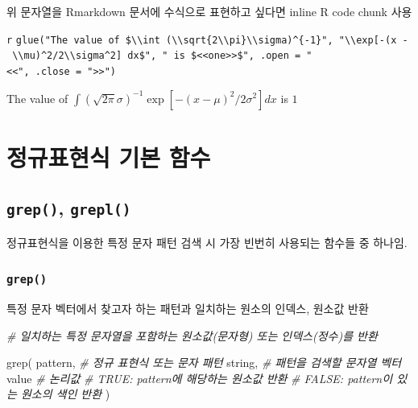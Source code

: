 \documentclass[
  11pt,
]{krantz}
\newenvironment{Shaded}{\begin{snugshade}}{\end{snugshade}}
\newcommand{\CommentTok}[1]{\textcolor[rgb]{0.37,0.37,0.37}{\textit{#1}}}
\newcommand{\FunctionTok}[1]{\textcolor[rgb]{0,0,0}{#1}}
\newcommand{\NormalTok}[1]{#1}
\begin{document}
\normalsize

위 문자열을 Rmarkdown 문서에 수식으로 표현하고 싶다면 inline R code chunk 사용

\texttt{\textasciigrave{}r} \texttt{glue("The\ value\ of\ \$\textbackslash{}\textbackslash{}int\ (\textbackslash{}\textbackslash{}sqrt\{2\textbackslash{}\textbackslash{}pi\}\textbackslash{}\textbackslash{}sigma)\^{}\{-1\}",\ "\textbackslash{}\textbackslash{}exp{[}-(x\ -\ \textbackslash{}\textbackslash{}mu)\^{}2/2\textbackslash{}\textbackslash{}sigma\^{}2{]}\ dx\$",\ "\ is\ \$\textless{}\textless{}one\textgreater{}\textgreater{}\$",\ .open\ =\ "\textless{}\textless{}",\ .close\ =\ "\textgreater{}\textgreater{}")} \texttt{\textasciigrave{}}

The value of \(\int (\sqrt{2\pi}\sigma)^{-1}\exp[-(x - \mu)^2/2\sigma^2] dx\) is \(1\)

\hypertarget{regexp-basic-fun}{%
\section{정규표현식 기본 함수}\label{regexp-basic-fun}}

\hypertarget{grep-grepl}{%
\subsection{\texorpdfstring{\textbf{\texttt{grep()}, \texttt{grepl()}}}{grep(), grepl()}}\label{grep-grepl}}

정규표현식을 이용한 특정 문자 패턴 검색 시 가장 빈번히 사용되는 함수들 중 하나임.

\hypertarget{grep}{%
\subsubsection*{\texorpdfstring{\textbf{\texttt{grep()}}}{grep()}}\label{grep}}


특정 문자 벡터에서 찾고자 하는 패턴과 일치하는 원소의 인덱스, 원소값 반환

\footnotesize

\begin{Shaded}
\begin{Highlighting}[]
\CommentTok{\# 일치하는 특정 문자열을 포함하는 원소값(문자형) 또는 인덱스(정수)를 반환}

\FunctionTok{grep}\NormalTok{(}
\NormalTok{  pattern, }\CommentTok{\# 정규 표현식 또는 문자 패턴}
\NormalTok{  string,  }\CommentTok{\# 패턴을 검색할 문자열 벡터}
\NormalTok{  value    }\CommentTok{\# 논리값 }
           \CommentTok{\# TRUE: pattern에 해당하는 원소값 반환}
           \CommentTok{\# FALSE: pattern이 있는 원소의 색인 반환}
\NormalTok{)}
\end{Highlighting}
\end{Shaded}
\end{document}
